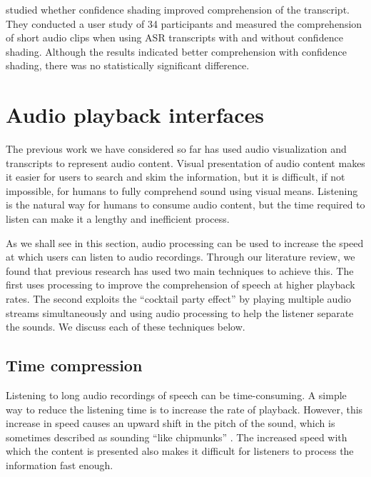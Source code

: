\citet{Vemuri2004} studied whether confidence shading improved comprehension of the transcript. They conducted a user
study of 34 participants and measured the comprehension of short audio clips when using ASR
transcripts with and without confidence shading. Although the results indicated better comprehension with confidence
shading, there was no statistically significant difference.





















\section{Audio playback interfaces}\label{sec:background-playback}

The previous work we have considered so far has used audio visualization and transcripts to represent audio content.
Visual presentation of audio content makes it easier for users to search and skim the information, but it is difficult,
if not impossible, for humans to fully comprehend sound using visual means. Listening is the natural way for humans to
consume audio content, but the time required to listen can make it a lengthy and inefficient process.

As we shall see in this section, audio processing can be used to increase the speed at which users can listen to audio
recordings. Through our literature review, we found that previous research has used two main techniques to achieve this. The first
uses processing to improve the comprehension of speech at higher playback rates.  The second exploits the ``cocktail
party effect'' by playing multiple audio streams simultaneously and using audio processing to help the listener
separate the sounds.  We discuss each of these techniques below.

\subsection{Time compression}\label{sec:background-time-compression}

Listening to long audio recordings of speech can be time-consuming. A simple way to reduce the listening time is to
increase the rate of playback.  However, this increase in speed causes an upward shift in the pitch of the sound, which
is sometimes described as sounding ``like chipmunks'' \citep{Vemuri2004,Ranjan2006}.  The increased speed with which
the content is presented also makes it difficult for listeners to process the information fast enough.

